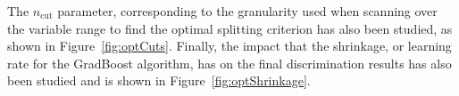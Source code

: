 \documentclass[a4paper, 10pt, openright]{report}
\begin{document}
\begin{appendices}
The $n_{\text{cut}}$ parameter, corresponding to the granularity used when scanning over the variable range to find the optimal splitting criterion has also been studied, as shown in Figure~\ref{fig:optCuts}. Finally, the impact that the shrinkage, or learning rate for the GradBoost algorithm, has on the final discrimination results has also been studied and is shown in Figure~\ref{fig:optShrinkage}.



\end{appendices}
\end{document}
